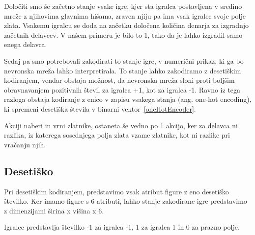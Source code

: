 \documentclass[a4paper, 12pt]{book}
\begin{document}
Določiti smo še začetno stanje vsake igre, kjer sta igralca postavljena v sredino mreže z njihovima glavnima hišama, zraven njiju pa ima vsak igralec svoje polje zlata. 
Vsakemu igralcu se doda na začetku določena količina denarja za izgradnjo začetnih delavcev. V našem primeru je bilo to 1, tako da je lahko izgradil samo enega delavca.

Sedaj pa smo potrebovali zakodirati to stanje igre, v numerični prikaz, ki ga bo nevronska mreža lahko interpretirala. 
To stanje lahko zakodiramo z desetiškim kodiranjem, vendar obstaja možnost, da nevronska mreža sloni proti boljšim obravnavanjem pozitivnih števil za igralca +1, kot za igralca -1. 
Ravno iz tega razloga obstaja kodiranje z enico v zapisu vsakega stanja (ang. one-hot encoding), ki spremeni desetiška števila v binarni vektor~\ref{oneHotEncoder}.

Akciji naberi in vrni zlatnike, ostaneta še vedno po 1 akcijo, ker za delavca ni razlika, iz katerega sosednjega polja zlata vzame zlatnike, kot ni razlike pri vračanju njih.

\subsection{Desetiško}
Pri desetiškim kodiranjem, predstavimo vsak atribut figure z eno desetiško številko.
Ker imamo figure s 6 atributi, lahko stanje zakodirane igre predstavimo z dimenzijami širina x višina x 6.

Igralec predstavlja številko -1 za igralca -1, 1 za igralca 1 in 0 za prazno polje.
\end{document}
